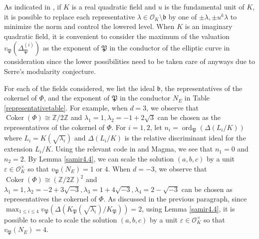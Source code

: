 \documentclass[]{article}
\newcommand {\ZZ}{{\mathbb{Z}}}
\newcommand {\mcalO}{{\mathcal{O}}}
\newcommand {\mfp}{{\mathfrak{P}}}
\begin{document}
As indicated in \cite{freitas2015fermat}, if $K$ is a real quadratic field and $u$ is the fundamental unit of $K$, it is possible to replace each representative $\lambda\in\mcalO_K\setminus\mathfrak{b}$ by one of $\pm\lambda, \pm u^k\lambda$ to minimize the norm and control the lowered level. When $K$ is an imaginary quadratic field, it is convenient to consider the maximum of the valuation $v_{\mfp}\left(\Delta_{\mfp}^{(i)}\right)$ as the exponent of $\mfp$ in the conductor of the elliptic curve in consideration since the lower possibilities need to be taken care of anyways due to Serre's modularity conjecture. 

For each of the fields considered, we list the ideal $\mathfrak{b}$, the representatives of the cokernel of $\Phi$, and the exponent of $\mfp$ in the conductor $N_E$ in Table \ref{representativetable}. For example, when $d=3$, we observe that $\operatorname{Coker}(\Phi)\cong \ZZ/2\ZZ$ and $\lambda_1=1,\lambda_2=-1+2\sqrt{3}$ can be chosen as the representatives of the cokernel of $\Phi$. For $i=1,2$, let $n_i=\operatorname{ord}_{\mathfrak{P}}\left(\Delta\left(L_i / K\right)\right)$ where $L_i=K\left(\sqrt{\lambda_i}\right)$ and $\Delta\left(L_i / K\right)$ is the relative discriminant ideal for the extension $L_i / K$. Using the relevant code in \cite{Khawaja_Fermat} and Magma, we see that $n_1=0$ and $n_2=2$. By Lemma \ref{samir4.4}, we can scale the solution $(a,b,c)$ by a unit $\varepsilon \in \mathcal{O}_K^{\times}$ so that $v_{\mathfrak{P}}\left(N_E\right)=1$ or $4$. When $d=-3$, we observe that $\operatorname{Coker}(\Phi)\cong \left(\ZZ/2\ZZ\right)^2$ and $\lambda_1=1, \lambda_2=-2+3\sqrt{-3}, \lambda_3=1+4 \sqrt{-3}, \lambda_4=2-\sqrt{-3}$ can be chosen as representatives the cokernel of $\Phi$. As discussed in the previous paragraph, since $\max _{1 \leq i \leq 4} v_{\mfp}\left(\Delta\left(K_{\mfp}\left(\sqrt{\lambda_i}\right) / K_{\mfp}\right)\right)=2$, using Lemma \ref{samir4.4}, it is possible to scale to scale the solution $(a,b,c)$ by a unit $\varepsilon \in \mathcal{O}_K^{\times}$ so that $v_{\mathfrak{P}}\left(N_E\right)=4$.
\end{document}
